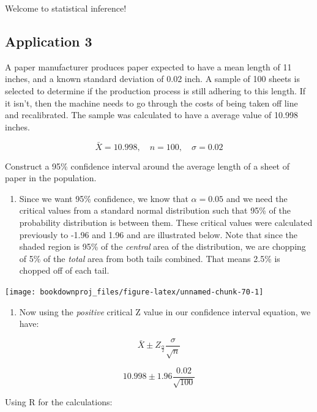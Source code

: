 \documentclass[
]{book}
\providecommand{\tightlist}{%
  \setlength{\itemsep}{0pt}\setlength{\parskip}{0pt}}
\begin{document}
Welcome to statistical inference!

\hypertarget{application-3}{%
\subsection{Application 3}\label{application-3}}

A paper manufacturer produces paper expected to have a mean length of 11 inches, and a known standard deviation of 0.02 inch. A sample of 100 sheets is selected to determine if the production process is still adhering to this length. If it isn't, then the machine needs to go through the costs of being taken off line and recalibrated. The sample was calculated to have a average value of 10.998 inches.

\[\bar{X} = 10.998, \quad n = 100, \quad \sigma = 0.02\]

Construct a 95\% confidence interval around the average length of a sheet of paper in the population.

\begin{enumerate}
\def\labelenumi{\arabic{enumi}.}
\tightlist
\item
  Since we want 95\% confidence, we know that \(\alpha = 0.05\) and we need the critical values from a standard normal distribution such that 95\% of the probability distribution is between them. These critical values were calculated previously to -1.96 and 1.96 and are illustrated below. Note that since the shaded region is 95\% of the \emph{central} area of the distribution, we are chopping of 5\% of the \emph{total} area from both tails combined. That means 2.5\% is chopped off of each tail.
\end{enumerate}

\begin{center}\texttt{[image: bookdownproj\_files/figure-latex/unnamed-chunk-70-1]} \end{center}

\begin{enumerate}
\def\labelenumi{\arabic{enumi}.}
\setcounter{enumi}{1}
\tightlist
\item
  Now using the \emph{positive} critical Z value in our confidence interval equation, we have:
\end{enumerate}

\[\bar{X} \pm Z_{\frac{\alpha}{2}}\frac{\sigma}{\sqrt{n}}\]

\[10.998 \pm 1.96\frac{0.02}{\sqrt{100}}\]

Using R for the calculations:
\end{document}
